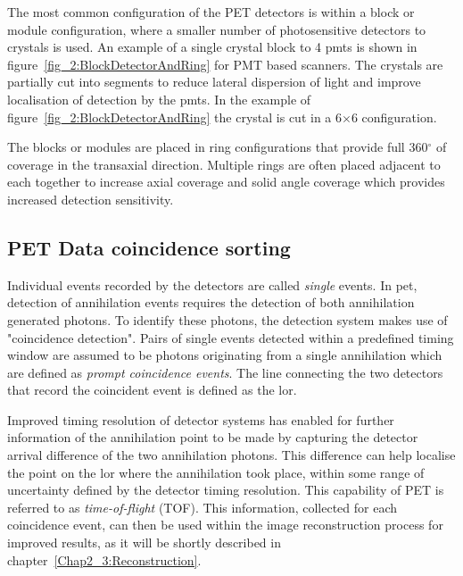 %
The most common configuration of the PET detectors is within a block or module configuration, where a smaller number of photosensitive detectors to crystals is used. An example of a single crystal block to 4 \glspl{pmt} is shown in figure~\ref{fig_2:BlockDetectorAndRing} for PMT based scanners. The crystals are partially cut into segments to reduce lateral dispersion of light and improve localisation of detection by the \glspl{pmt}. In the example of figure~\ref{fig_2:BlockDetectorAndRing} the crystal is cut in a 6$\times$6 configuration.

The blocks or modules are placed in ring configurations that provide full 360$^{\circ}$ of coverage in the transaxial direction. Multiple rings are often placed adjacent to each together to increase axial coverage and solid angle coverage which provides increased detection sensitivity. 

\subsection{PET Data coincidence sorting}
Individual events recorded by the detectors are called \textit{single} events. In \gls{pet}, detection of annihilation events requires the detection of both annihilation generated photons. To identify these photons, the detection system makes use of "coincidence detection". Pairs of single events detected within a predefined timing window are assumed to be photons originating from a single annihilation which are defined as \textit{prompt coincidence events}.
The line connecting the two detectors that record the coincident event is defined as the \gls{lor}.

Improved timing resolution of detector systems has enabled for further information of the annihilation point to be made by capturing the detector arrival difference of the two annihilation photons. This difference can help localise the point on the \gls{lor} where the annihilation took place, within some range of uncertainty defined by the detector timing resolution. This capability of PET is referred to as \textit{time-of-flight} (TOF).
This information, collected for each coincidence event, can then be used within the image reconstruction process for improved results, as it will be shortly described in chapter~\ref{Chap2_3:Reconstruction}.

